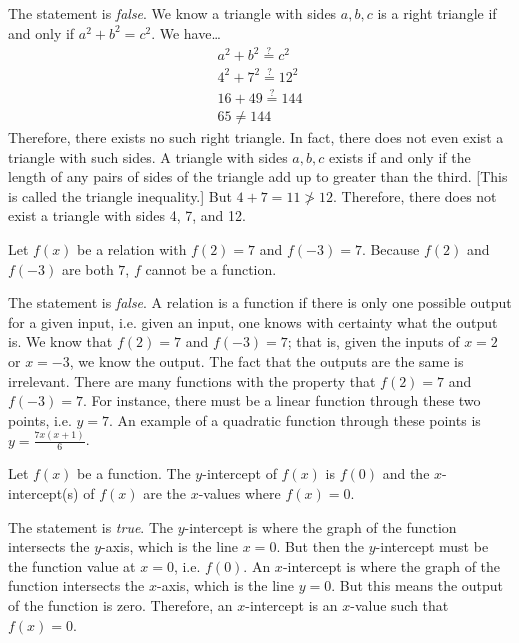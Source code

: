 \documentclass[11pt,letterpaper]{article}
\begin{document}
\sol The statement is \textit{false}. We know a triangle with sides $a, b, c$ is a right triangle if and only if $a^2 + b^2= c^2$. We have\dots
	\[
	\begin{gathered}
	a^2 + b^2\stackrel{?}{=} c^2 \\
	4^2 + 7^2\stackrel{?}{=} 12^2 \\
	16 + 49\stackrel{?}{=} 144 \\
	65 \neq 144
	\end{gathered}
	\]
Therefore, there exists no such right triangle. In fact, there does not even exist a triangle with such sides. A triangle with sides $a, b, c$ exists if and only if the length of any pairs of sides of the triangle add up to greater than the third. [This is called the triangle inequality.] But $4 + 7= 11 \not> 12$. Therefore, there does not exist a triangle with sides 4, 7, and 12. \pvspace{1.3cm}



 Let $f(x)$ be a relation with $f(2)= 7$ and $f(-3)= 7$. Because $f(2)$ and $f(-3)$ are both $7$, $f$ cannot be a function. \pspace

\sol The statement is \textit{false}. A relation is a function if there is only one possible output for a given input, i.e. given an input, one knows with certainty what the output is. We know that $f(2)= 7$ and $f(-3)= 7$; that is, given the inputs of $x= 2$ or $x= -3$, we know the output. The fact that the outputs are the same is irrelevant. There are many functions with the property that $f(2)= 7$ and $f(-3)= 7$. For instance, there must be a linear function through these two points, i.e. $y= 7$. An example of a quadratic function through these points is $y= \frac{7x(x + 1)}{6}$. \pvspace{1.3cm}



 Let $f(x)$ be a function. The $y$-intercept of $f(x)$ is $f(0)$ and the $x$-intercept(s) of $f(x)$ are the $x$-values where $f(x)= 0$. \pspace

\sol The statement is \textit{true}. The $y$-intercept is where the graph of the function intersects the $y$-axis, which is the line $x= 0$. But then the $y$-intercept must be the function value at $x= 0$, i.e. $f(0)$. An $x$-intercept is where the graph of the function intersects the $x$-axis, which is the line $y= 0$. But this means the output of the function is zero. Therefore, an $x$-intercept is an $x$-value such that $f(x)= 0$. \pvspace{1.3cm}
\end{document}
